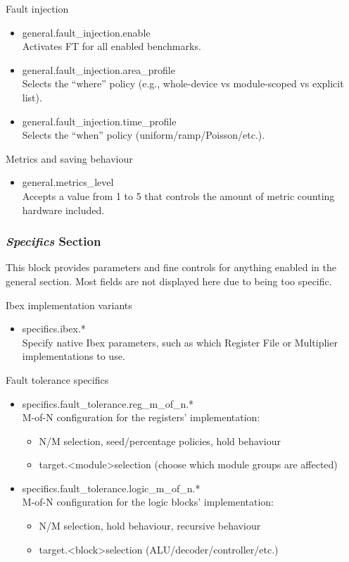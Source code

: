  Fault injection
\begin{itemize}
    \item general.fault\_injection.enable \\
    Activates \ac{FT} for all enabled benchmarks.
    \item general.fault\_injection.area\_profile \\
    Selects the “where” policy (e.g., whole-device vs module-scoped vs explicit list).
    \item general.fault\_injection.time\_profile \\
    Selects the “when” policy (uniform/ramp/Poisson/etc.).
\end{itemize}

 Metrics and saving behaviour
\begin{itemize}
    \item general.metrics\_level \\
    Accepts a value from 1 to 5 that controls the amount of metric counting hardware included.
\end{itemize}

\subsubsection{\textit{Specifics} Section}
\label{chap3:yaml_specifics}
 This block provides parameters and fine controls for anything enabled in the general section. Most fields are not displayed here due to being too specific.

 Ibex implementation variants
\begin{itemize}
    \item specifics.ibex.*\\
    Specify native Ibex parameters, such as which Register File or Multiplier implementations to use.
\end{itemize}

 Fault tolerance specifics
\begin{itemize}
    \item specifics.fault\_tolerance.reg\_m\_of\_n.* \\
    M-of-N configuration for the registers' implementation:
    \begin{itemize}
        \item N/M selection, seed/percentage policies, hold behaviour
        \item target.\textless module\textgreater selection (choose which module groups are affected)
    \end{itemize}
    \item specifics.fault\_tolerance.logic\_m\_of\_n.* \\
    M-of-N configuration for the logic blocks' implementation:
    \begin{itemize}
        \item N/M selection, hold behaviour, recursive behaviour
        \item target.\textless block\textgreater selection (ALU/decoder/controller/etc.)
    \end{itemize}
\end{itemize}


